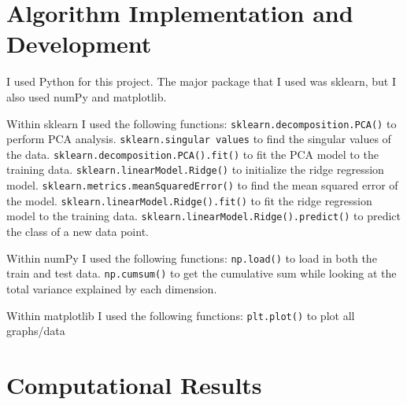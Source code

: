 \documentclass[11pt]{amsart}
\begin{document}
\section{Algorithm Implementation and Development}\label{sec:algorithms}
I used Python for this project. The major package that I used was sklearn, but I also used numPy and matplotlib. 

Within sklearn I used the following functions:
\subitem \texttt{sklearn.decomposition.PCA()} to perform PCA analysis.
\subitem \texttt{sklearn.singular values} to find the singular values of the data.
\subitem \texttt{sklearn.decomposition.PCA().fit()} to fit the PCA model to the training data.
\subitem \texttt{sklearn.linearModel.Ridge()} to initialize the ridge regression model.
\subitem \texttt{sklearn.metrics.meanSquaredError()} to find the mean squared error of the model.
\subitem \texttt{sklearn.linearModel.Ridge().fit()} to fit the ridge regression model to the training data.
\subitem \texttt{sklearn.linearModel.Ridge().predict()} to predict the class of a new data point.

Within numPy I used the following functions:
\subitem \texttt{np.load()} to load in both the train and test data.
\subitem \texttt{np.cumsum()} to get the cumulative sum while looking at the total variance explained by each dimension.

Within matplotlib I used the following functions:
\subitem \texttt{plt.plot()} to plot all graphs/data




\section{Computational Results}\label{sec:results}



\end{document}

